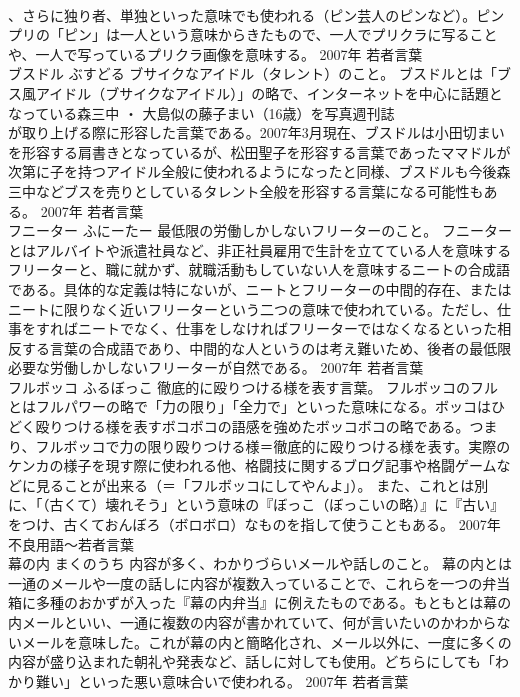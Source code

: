 \documentclass[8pt]{extreport}
\begin{document}
\begin{CJK}{UTF8}{min}
\\	、さらに独り者、単独といった意味でも使われる（ピン芸人のピンなど）。ピンプリの「ピン」は一人という意味からきたもので、一人でプリクラに写ることや、一人で写っているプリクラ画像を意味する。	2007年	若者言葉	
\\	ブスドル	ぶすどる	ブサイクなアイドル（タレント）のこと。	ブスドルとは「ブス風アイドル（ブサイクなアイドル）」の略で、インターネットを中心に話題となっている森三中 ・ 大島似の藤子まい（16歳）を写真週刊誌
\\	が取り上げる際に形容した言葉である。2007年3月現在、ブスドルは小田切まいを形容する肩書きとなっているが、松田聖子を形容する言葉であったママドルが次第に子を持つアイドル全般に使われるようになったと同様、ブスドルも今後森三中などブスを売りとしているタレント全般を形容する言葉になる可能性もある。	2007年	若者言葉	
\\	フニーター	ふにーたー	最低限の労働しかしないフリーターのこと。	フニーターとはアルバイトや派遣社員など、非正社員雇用で生計を立てている人を意味するフリーターと、職に就かず、就職活動もしていない人を意味するニートの合成語である。具体的な定義は特にないが、ニートとフリーターの中間的存在、またはニートに限りなく近いフリーターという二つの意味で使われている。ただし、仕事をすればニートでなく、仕事をしなければフリーターではなくなるといった相反する言葉の合成語であり、中間的な人というのは考え難いため、後者の最低限必要な労働しかしないフリーターが自然である。	2007年	若者言葉	
\\	フルボッコ	ふるぼっこ	徹底的に殴りつける様を表す言葉。	フルボッコのフルとはフルパワーの略で「力の限り」「全力で」といった意味になる。ボッコはひどく殴りつける様を表すボコボコの語感を強めたボッコボコの略である。つまり、フルボッコで力の限り殴りつける様＝徹底的に殴りつける様を表す。実際のケンカの様子を現す際に使われる他、格闘技に関するブログ記事や格闘ゲームなどに見ることが出来る（＝「フルボッコにしてやんよ」）。 また、これとは別に、「（古くて）壊れそう」という意味の『ぼっこ（ぼっこいの略）』に『古い』をつけ、古くておんぼろ（ボロボロ）なものを指して使うこともある。	2007年	不良用語～若者言葉	
\\	幕の内	まくのうち	内容が多く、わかりづらいメールや話しのこと。	幕の内とは一通のメールや一度の話しに内容が複数入っていることで、これらを一つの弁当箱に多種のおかずが入った『幕の内弁当』に例えたものである。もともとは幕の内メールといい、一通に複数の内容が書かれていて、何が言いたいのかわからないメールを意味した。これが幕の内と簡略化され、メール以外に、一度に多くの内容が盛り込まれた朝礼や発表など、話しに対しても使用。どちらにしても「わかり難い」といった悪い意味合いで使われる。	2007年	若者言葉	

\end{CJK}
\end{document}
